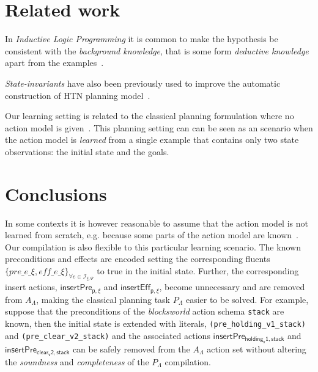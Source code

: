 \documentclass{article}
\begin{document}
\section{Related work}
\label{sec:related}
In {\em Inductive Logic Programming} it is common to make the hypothesis be consistent with the {\em background knowledge}, that is some form {\em deductive knowledge} apart from the examples~\cite{muggleton1994inductive}.

{\em State-invariants} have also been previously used to improve the automatic construction of HTN planning model~\cite{lotinac2016constructing}.

Our learning setting is related to the classical planning formulation where no action model is given~\cite{SternJ17}. This planning setting can can be seen as an scenario when the action model is {\em learned} from a single example that contains only two state observations: the initial state and the goals.

\section{Conclusions}
\label{sec:conclusions}
In some contexts it is however reasonable to assume that the action model is not learned from scratch, e.g. because some parts of the action model are known~\cite{ZhuoNK13,sreedharan2018handling,pereira2018heuristic}. Our compilation is also flexible to this particular learning scenario. The known preconditions and effects are encoded setting the corresponding fluents $\{pre\_e\_\xi, eff\_e\_\xi\}_{\forall e\in{\mathcal I}_{\xi,\Psi}}$ to true in the initial state. Further, the corresponding insert actions, $\mathsf{insertPre_{p,\xi}}$ and $\mathsf{insertEff_{p,\xi}}$, become unnecessary and are removed from $A_{\Lambda}$, making the classical planning task $P_{\Lambda}$ easier to be solved. For example, suppose that the preconditions of the {\em blocksworld} action schema {\tt stack} are known, then the initial state is extended with literals, {\small\tt(pre\_holding\_v1\_stack)} and {\small\tt(pre\_clear\_v2\_stack)} and the associated actions $\mathsf{insertPre_{holding_v1,stack}}$ and $\mathsf{insertPre_{clear_v2,stack}}$ can be safely removed from the $A_{\Lambda}$ action set without altering the {\em soundness} and {\em completeness} of the $P_{\Lambda}$ compilation.



\end{document}
